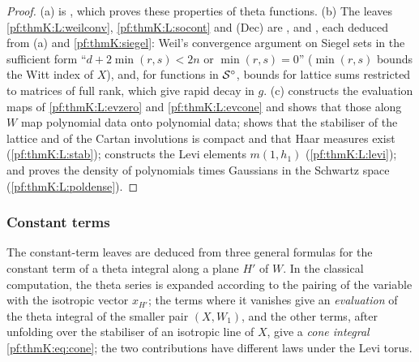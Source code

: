 \begin{proof}
(a) is , which proves these properties of theta functions. (b) The leaves
\ref{pf:thmK:L:weilconv}, \ref{pf:thmK:L:socont} and \textup{(Dec)} are ,
 and , each deduced from (a) and
\cref{pf:thmK:siegel}: Weil's convergence argument \cite{Weil1965} on Siegel sets in the sufficient form ``$d+2\min(r,s)<2n$
or $\min(r,s)=0$'' ($\min(r,s)$ bounds the Witt index of $X$), and, for functions in $\mathcal{S}^{\circ}$, bounds for lattice sums
restricted to matrices of full rank, which give rapid decay in $g$. (c) 
constructs the evaluation maps of \ref{pf:thmK:L:evzero} and \ref{pf:thmK:L:evcone} and shows that those along $W$ map
polynomial data onto polynomial data;  shows that the stabiliser of the lattice
and of the Cartan involutions is compact and that Haar measures exist (\ref{pf:thmK:L:stab});
 constructs the Levi elements $m(1,h_1)$ (\ref{pf:thmK:L:levi}); and
 proves the density of polynomials times Gaussians in the Schwartz space
(\ref{pf:thmK:L:poldense}).
\end{proof}

\subsubsection{Constant terms}\label{sec:pf:thmK:ct}
The constant-term leaves are deduced from three general formulas for the constant term of a theta integral along a
plane $H'$ of $W$. In the classical computation, the theta series is expanded according to the pairing of the variable
with the isotropic vector $x_{H'}$; the terms where it vanishes give an \emph{evaluation} of the theta integral of the
smaller pair $(X,W_1)$, and the other terms, after unfolding over the stabiliser of an isotropic line of $X$, give a
\emph{cone integral} \eqref{pf:thmK:eq:cone}; the two contributions have different laws under the Levi torus.

